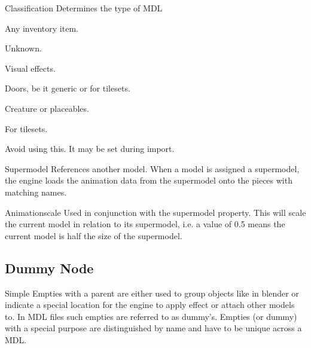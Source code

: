 \begin{propertyAurora}{Classification}
Determines the type of MDL
\begin{description}[leftmargin=6em,style=nextline]
    \item[Item] Any inventory item.
    \item[GUI] Unknown.
    \item[Effect] Visual effects.
    \item[Door] Doors, be it generic or for tilesets.
    \item[Character] Creature or placeables. 
    \item[Tile] For tilesets.
    \item[Unknown] Avoid using this. It may be set during import.
\end{description}
\end{propertyAurora}




\begin{propertyAurora}{Supermodel}
References another model. When a model is assigned a supermodel, 
the engine loads the animation data from the supermodel onto the 
pieces with matching names.
\end{propertyAurora}

\begin{propertyAurora}{Animationscale}
Used in conjunction with the supermodel property. This will scale the current model in relation to 
its supermodel, i.e. a value of 0.5 means the current model is half the size of the supermodel.
\end{propertyAurora}

\subsection{Dummy Node}
\begin{minipage}[t]{0.55\textwidth}
    Simple Empties with a parent are either used to group objects like in blender or
    indicate a special location for the engine to apply effect or attach other models to. 
    In MDL files such empties are referred to as dummy's. Empties (or dummy) with a 
    special purpose are distinguished by name and have to be unique across a MDL.
\end{minipage}\hfill
\begin{minipage}[t]{0.4\textwidth}
    \centering{}
    \label{fig1}
\end{minipage}


